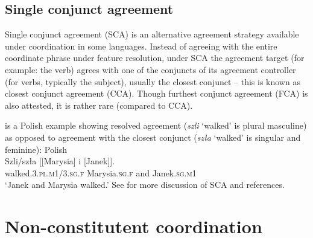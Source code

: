 \documentclass[output=paper]{../langscibook}
\begin{document}
\ea\label{ex:fstr:NP:John:Mary:sing:walk}
\z

\subsection{Single conjunct agreement}
\label{sec:Coordination:intro:sca}

Single conjunct agreement (SCA) is an alternative agreement strategy
available under coordination in some languages. Instead of agreeing
with the entire coordinate phrase under feature resolution, under SCA
the agreement target (for example: the verb) agrees with one of the
conjuncts of its agreement controller (for verbs, typically the subject),
usually the closest conjunct – this is known as closest conjunct
agreement (CCA). Though furthest conjunct agreement (FCA) is also
attested, it is rather rare (compared to CCA).

 is a Polish example showing resolved
agreement (\emph{szli} `walked' is plural masculine) as opposed to
agreement with the closest conjunct (\emph{szła} `walked' is singular
and feminine):
\ea\label{ex:SCA:CCA:VSUBJ}Polish\\\gll
Szli/szła [[Marysia] i [Janek]]. \\
walked.\textsc{3.pl.m1/3.sg.f} \phtm{[}Marysia.\textsc{sg.f} and \phtm{[}Janek.\textsc{sg.m1}\\
\glt`Janek and Marysia walked.'
\z
See  for more discussion of SCA and references.


\section{Non-constitutent coordination}
\label{sec:Coordination:NCC}
\end{document}
